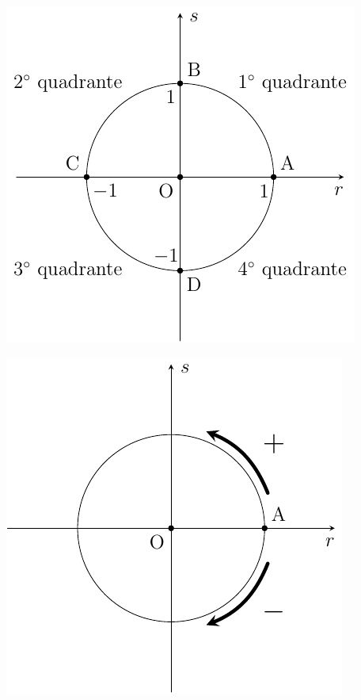 \begin{minipage}{13.5cm}
     \centering
\begin{minipage}{6cm}
     \centering
            \includegraphics[width=\textwidth]{Imagens/fig07.pdf}
\end{minipage}
\hfill
\begin{minipage}{6cm}
        \centering
            \includegraphics[width=\textwidth]{Imagens/fig08.pdf}
\end{minipage}
\label{fig:fig07e08}
\end{minipage}


